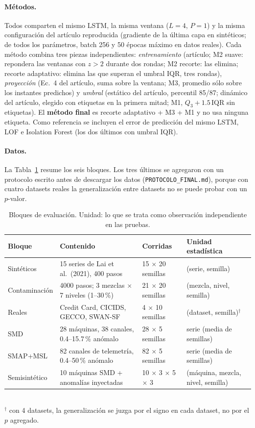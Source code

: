 \documentclass[10pt,a4paper]{article}
\newcommand{\MI}{M1}\newcommand{\MII}{M2}\newcommand{\MIII}{M3}
\begin{document}
\paragraph{Métodos.} Todos comparten el mismo LSTM, la misma ventana ($L{=}4$, $P{=}1$) y la misma
configuración del artículo reproducida (gradiente de la última capa en sintéticos; de todos los parámetros,
batch 256 y 50 épocas máximo en datos reales). Cada método combina tres piezas independientes:
\emph{entrenamiento} (artículo; \MII{} suave: repondera las ventanas con $z>2$ durante dos rondas; \MII{}
recorte: las elimina; recorte adaptativo: elimina las que superan el umbral IQR, tres rondas),
\emph{proyección} (Ec.~4 del artículo, suma sobre la ventana; \MIII{}, promedio sólo sobre los instantes
predichos) y \emph{umbral} (estático del artículo, percentil 85/87; dinámico del artículo, elegido con
etiquetas en la primera mitad; \MI{}, $Q_3+1.5\,\mathrm{IQR}$ sin etiquetas). El \textbf{método final} es
recorte adaptativo + \MIII{} + \MI{} y no usa ninguna etiqueta. Como referencia se incluyen el error de
predicción del mismo LSTM, LOF e Isolation Forest (los dos últimos con umbral IQR).

\paragraph{Datos.} La Tabla~\ref{tab:datos} resume los seis bloques. Los tres últimos se agregaron con un
protocolo escrito antes de descargar los datos (\texttt{PROTOCOLO\_FINAL.md}), porque con cuatro datasets
reales la generalización entre datasets no se puede probar con un $p$-valor.

\begin{table}[t]
\centering\small
\caption{Bloques de evaluación. Unidad: lo que se trata como observación independiente en las pruebas.}
\label{tab:datos}
\begin{tabular}{llll}
\toprule
Bloque & Contenido & Corridas & Unidad estadística \\
\midrule
Sintéticos & 15 series de Lai et al.\ (2021), 400 pasos & 15 $\times$ 20 semillas & (serie, semilla) \\
Contaminación & 4000 pasos; 3 mezclas $\times$ 7 niveles (1--30\,\%) & 21 $\times$ 20 semillas & (mezcla, nivel, semilla) \\
Reales & Credit Card, CICIDS, GECCO, SWAN-SF & 4 $\times$ 10 semillas & (dataset, semilla)$^\dagger$ \\
SMD & 28 máquinas, 38 canales, 0.4--15.7\,\% anómalo & 28 $\times$ 5 semillas & serie (media de semillas) \\
SMAP+MSL & 82 canales de telemetría, 0.4--50\,\% anómalo & 82 $\times$ 5 semillas & serie (media de semillas) \\
Semisintético & 10 máquinas SMD + anomalías inyectadas & 10 $\times$ 3 $\times$ 5 $\times$ 3 & (máquina, mezcla, nivel, semilla) \\
\bottomrule
\end{tabular}\\[2pt]
{\footnotesize $^\dagger$ con 4 datasets, la generalización se juzga por el signo en cada dataset, no por el $p$ agregado.}
\end{table}
\end{document}
